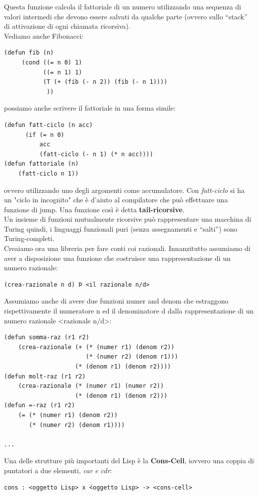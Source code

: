 \documentclass[a4paper,12pt, oneside]{book}
\begin{document}
Questa funzione calcola il fattoriale di un numero utilizzando
una sequenza di valori intermedi che devono essere salvati da
qualche parte (ovvero sullo “stack” di attivazione di ogni
chiamata ricorsiva). \\
Vediamo anche Fibonacci:
\begin{verbatim}
(defun fib (n)
     (cond ((= n 0) 1)
           ((= n 1) 1)
           (T (+ (fib (- n 2)) (fib (- n 1))))
            ))
\end{verbatim}
possiamo anche scrivere il fattoriale in una forma simile:
\begin{verbatim}
(defun fatt-ciclo (n acc)
      (if (= n 0)
          acc
          (fatt-ciclo (- n 1) (* n acc))))
(defun fattoriale (n)
    (fatt-ciclo n 1))
\end{verbatim}
ovvero utilizzando uno degli argomenti come accumulatore. Con \textit{fatt-ciclo} si ha un "ciclo in incognito" che è d'aiuto al compilatore che può effettuare una funzione di jump. Una funzione così è detta \textbf{tail-ricorsive}.\\
Un insieme di funzioni mutualmente ricorsive può rappresentare una
macchina di Turing quindi, i linguaggi funzionali puri (senza assegnamenti e “salti”) sono Turing-completi.\\
Creaiamo ora una libreria per fare conti coi razionali. Innanzitutto assumiamo di aver a disposizione una funzione che
costruisce una rappresentazione di un numero razionale:
\begin{verbatim}
(crea-razionale n d) Þ <il razionale n/d>
\end{verbatim}
Assumiamo anche di avere due funzioni numer and denom che
estraggono rispettivamente il numeratore n ed il denominatore d dalla
rappresentazione di un numero razionale <razionale n/d>:
\begin{verbatim}
(defun somma-raz (r1 r2)
    (crea-razionale (+ (* (numer r1) (denom r2))
                       (* (numer r2) (denom r1)))
                    (* (denom r1) (denom r2))))
(defun molt-raz (r1 r2)
    (crea-razionale (* (numer r1) (numer r2))
                    (* (denom r1) (denom r2)))
(defun =-raz (r1 r2)
    (= (* (numer r1) (denom r2))
       (* (numer r2) (denom r1))))
       
...
\end{verbatim}
Una delle strutture più importanti del Lisp è la \textbf{Cons-Cell}, iovvero una coppia di puntatori a due elementi, \textit{car e cdr}:
\begin{verbatim}
cons : <oggetto Lisp> x ́<oggetto Lisp> -> <cons-cell>
\end{verbatim}
\end{document}
